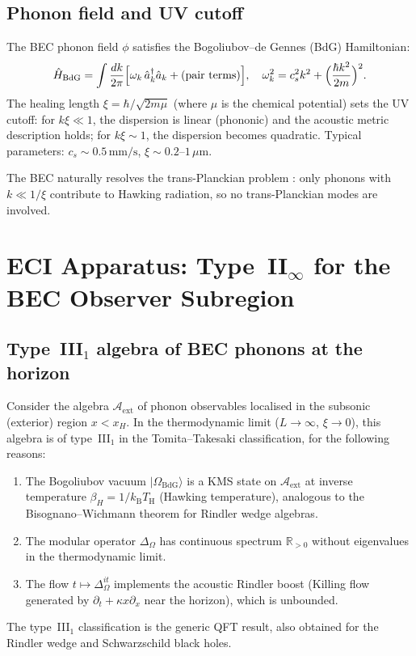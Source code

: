 \documentclass[12pt,a4paper]{article}
\renewcommand{\TH}{T_{\mathrm{H}}}
\newcommand{\kB}{k_{\mathrm{B}}}
\begin{document}
\subsection{Phonon field and UV cutoff}

The BEC phonon field $\phi$ satisfies the Bogoliubov--de Gennes (BdG)
Hamiltonian:
\begin{equation}
  \hat{H}_{\mathrm{BdG}} = \int \frac{dk}{2\pi}
    \Bigl[\omega_k\,\hat{a}_k^\dagger \hat{a}_k
    + \text{(pair terms)}\Bigr],
  \quad
  \omega_k^2 = c_s^2 k^2 + \Bigl(\frac{\hbar k^2}{2m}\Bigr)^2.
\end{equation}
The healing length $\xi = \hbar/\sqrt{2m\mu}$ (where $\mu$ is the chemical
potential) sets the UV cutoff: for $k\xi \ll 1$, the dispersion is
linear (phononic) and the acoustic metric description holds; for
$k\xi \sim 1$, the dispersion becomes quadratic.
Typical parameters: $c_s \sim 0.5\,\mathrm{mm/s}$, $\xi \sim 0.2$--$1\,\mu\mathrm{m}$.

The BEC naturally resolves the trans-Planckian problem \cite{jacobson1991}:
only phonons with $k \ll 1/\xi$ contribute to Hawking radiation, so no
trans-Planckian modes are involved.

\section{ECI Apparatus: Type~II$_\infty$ for the BEC Observer Subregion}
\label{sec:algebra}

\subsection{Type~III$_1$ algebra of BEC phonons at the horizon}

Consider the algebra $\mathcal{A}_{\mathrm{ext}}$ of phonon observables
localised in the subsonic (exterior) region $x < x_H$.
In the thermodynamic limit ($L \to \infty$, $\xi \to 0$), this algebra is
of type~III$_1$ in the Tomita--Takesaki classification, for the following
reasons:
\begin{enumerate}
  \item The Bogoliubov vacuum $|\Omega_{\mathrm{BdG}}\rangle$ is a KMS
    state on $\mathcal{A}_{\mathrm{ext}}$ at inverse temperature
    $\beta_H = 1/\kB \TH$ (Hawking temperature), analogous to the
    Bisognano--Wichmann theorem for Rindler wedge algebras.
  \item The modular operator $\Delta_\Omega$ has continuous spectrum
    $\mathbb{R}_{>0}$ without eigenvalues in the thermodynamic limit.
  \item The flow $t \mapsto \Delta_\Omega^{it}$ implements the acoustic
    Rindler boost (Killing flow generated by $\partial_t + \kappa x
    \partial_x$ near the horizon), which is unbounded.
\end{enumerate}
The type~III$_1$ classification is the generic QFT result, also obtained
for the Rindler wedge and Schwarzschild black holes.
\end{document}
